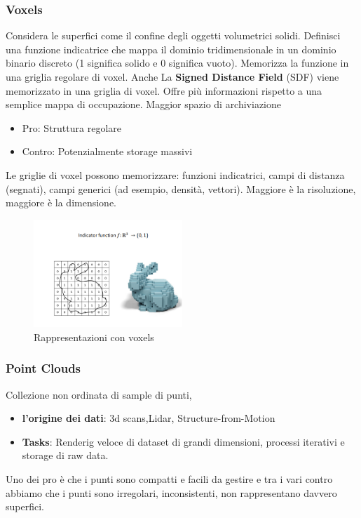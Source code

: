\subsubsection{Voxels}
Considera le superfici come il confine degli oggetti volumetrici solidi. Definisci una funzione indicatrice che mappa il dominio tridimensionale in un dominio binario discreto (1 significa solido e 0 significa vuoto). Memorizza la funzione in una griglia regolare di voxel.
Anche La \textbf{Signed Distance Field} (SDF) viene  memorizzato in una griglia di voxel. Offre più informazioni rispetto a una semplice mappa di occupazione. Maggior spazio di archiviazione
\begin{itemize}
    \item Pro: Struttura regolare
    \item Contro: Potenzialmente storage massivi
\end{itemize}
Le griglie di voxel possono memorizzare: funzioni indicatrici, campi di distanza (segnati), campi generici (ad esempio, densità, vettori). Maggiore è la risoluzione, maggiore è la dimensione.
\begin{figure}[H]
    \centering
    \includegraphics[width=0.5\textwidth]{images/voxels.png} 
    \caption{Rappresentazioni con voxels}
    \label{fig:immagine}
\end{figure}
\subsubsection{Point Clouds}
Collezione non ordinata di sample di punti, 
\begin{itemize}
    \item \textbf{l'origine dei dati}: 3d scans,Lidar, Structure-from-Motion
    \item \textbf{Tasks}: Renderig veloce di dataset di grandi dimensioni, processi iterativi e storage di raw data.
\end{itemize}
Uno dei pro è che i punti sono compatti e facili da gestire e tra i vari contro abbiamo che i punti 
sono irregolari, inconsistenti, non rappresentano davvero superfici.

